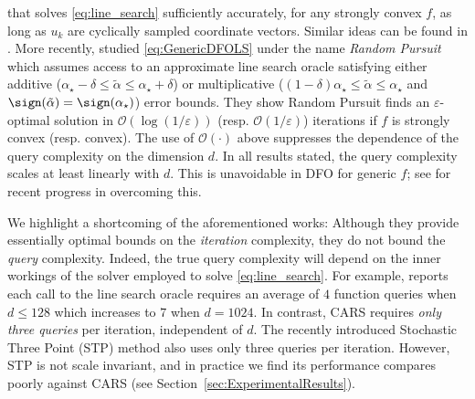 that solves \eqref{eq:line_search} sufficiently accurately, for any strongly convex $f$, as long as $u_k$ are cyclically sampled coordinate vectors.  Similar ideas can be found in \cite{grippo1988global, grippo2007nonmonotone,grippo2015class}. More recently, \cite{stich2013optimization} studied \eqref{eq:GenericDFOLS} under the name {\em Random Pursuit} which assumes access to an approximate line search oracle satisfying either additive ($\alpha_{\star} - \delta \leq \tilde{\alpha} \leq \alpha_{\star} + \delta$) or multiplicative ($(1-\delta)\alpha_{\star} \leq \tilde{\alpha} \leq \alpha_{\star}$ and $\sign(\tilde{\alpha}) = \sign(\alpha_{\star})$) error bounds. They show Random Pursuit finds an $\varepsilon$-optimal solution in $\mathcal{O}(\log(1/\varepsilon))$ (resp. $\mathcal{O}(1/\varepsilon )$) iterations if $f$ is strongly convex (resp. convex). The use of $\mathcal{O}(\cdot)$ above suppresses the dependence of the query complexity on the dimension $d$. In all results stated, the query complexity scales at least linearly with $d$. This is unavoidable in DFO for generic $f$; see \cite{wang2018stochastic, balasubramanian2018zeroth,cai2020zeroth,cai2020scobo,cai2021zeroth,cartis2021scalable} for recent progress in overcoming this.

We highlight a shortcoming of the aforementioned works: Although they provide essentially optimal bounds on the {\em iteration} complexity, they do not bound the {\em query} complexity. Indeed, the true query complexity will depend on the inner workings of the solver employed to solve \eqref{eq:line_search}. For example, \cite{stich2013optimization} reports each call to the line search oracle requires an average of $4$ function queries when $d \leq 128$ which increases to $7$ when $d = 1024$.  In contrast, CARS requires {\em only three queries} per iteration, independent of $d$. The recently introduced Stochastic Three Point (STP) method  \cite{bergou2020stochastic,bibi2020stochastic} also uses only three queries per iteration. However, STP is not scale invariant, and in practice we find its performance compares poorly against CARS (see Section~\ref{sec:ExperimentalResults}).


